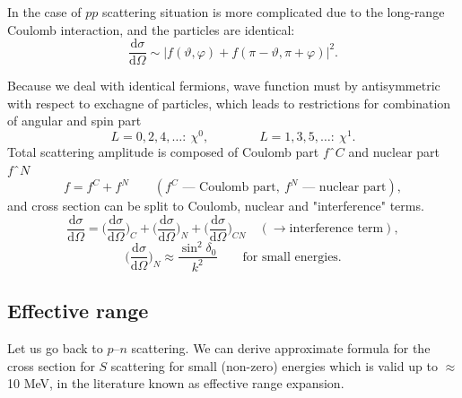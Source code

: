 \documentclass[11pt,a4paper]{article}
\newcommand{\ud}{\mathrm{d}}
\begin{document}
In the case of $pp$ scattering situation is more complicated due to the long-range Coulomb
interaction, and the particles are identical:
\[
\frac{\ud\sigma}{\ud\Omega}\sim\big|f(\vartheta,\varphi)+f(\pi-\vartheta,\pi+\varphi)\big|^2 .
\]

\begin{center}
\end{center}

Because we deal with identical fermions, wave function must by antisymmetric with respect to exchagne of particles, which leads to restrictions for combination of angular and spin part
\[
L=0,2,4,\dots:\ \chi^0,\qquad\qquad L=1,3,5,\dots:\ \chi^1 .
\]
Total scattering amplitude is composed of Coulomb part $fˆC$ and nuclear part $fˆN$
\[
f=f^C+f^N\qquad(f^C \text{ --- Coulomb part},\ f^N \text{ --- nuclear part}),
\]
and cross section can be split to Coulomb, nuclear and "interference" terms. 
\[
\frac{\ud\sigma}{\ud\Omega}=\Big(\frac{\ud\sigma}{\ud\Omega}\Big)_C
+\Big(\frac{\ud\sigma}{\ud\Omega}\Big)_N
+\Big(\frac{\ud\sigma}{\ud\Omega}\Big)_{CN}
\quad(\to \text{interference term}),
\]
\[
\Big(\frac{\ud\sigma}{\ud\Omega}\Big)_N\approx\frac{\sin^2\delta_0}{k^2}
\qquad\text{for small energies.}
\]

\subsection{Effective range}

Let us go back to $p$--$n$ scattering. We can derive approximate formula for the cross section for $S$ scattering for small (non-zero) energies which is valid up to $\approx$ 10 MeV, in the literature known as effective range expansion. 
\end{document}
